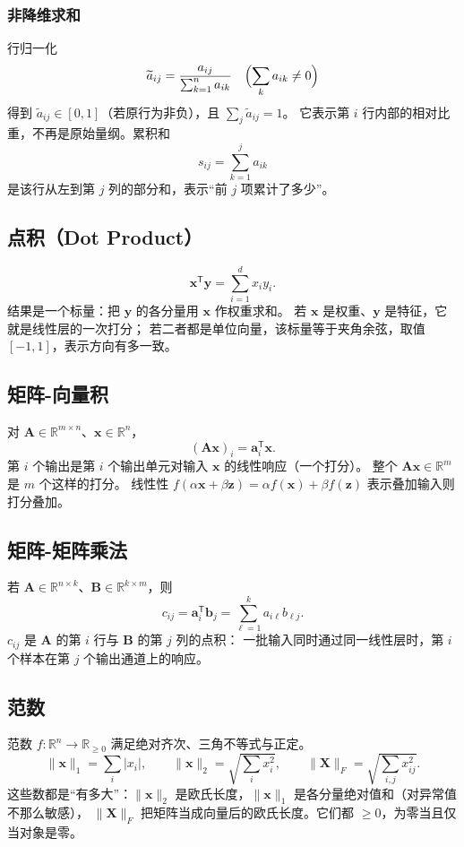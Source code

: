 \subsubsection{非降维求和}

行归一化
\[
\widetilde{a}_{ij}
=
\frac{a_{ij}}{\sum_{k=1}^{n}a_{ik}}
\quad
\Bigl(\sum_{k}a_{ik}\neq 0\Bigr)
\]
得到 $\widetilde{a}_{ij}\in[0,1]$（若原行为非负），且 $\sum_{j}\widetilde{a}_{ij}=1$。
它表示第 $i$ 行内部的相对比重，不再是原始量纲。累积和
\[
s_{ij}=\sum_{k=1}^{j}a_{ik}
\]
是该行从左到第 $j$ 列的部分和，表示“前 $j$ 项累计了多少”。

\subsection{点积（Dot Product）}

\[
\bm{x}^{\mathsf T}\bm{y}
=
\sum_{i=1}^{d}x_i y_i.
\]
结果是一个标量：把 $\bm{y}$ 的各分量用 $\bm{x}$ 作权重求和。
若 $\bm{x}$ 是权重、$\bm{y}$ 是特征，它就是线性层的一次打分；
若二者都是单位向量，该标量等于夹角余弦，取值 $[-1,1]$，表示方向有多一致。

\subsection{矩阵-向量积}

对 $\bm{A}\in\mathbb{R}^{m\times n}$、$\bm{x}\in\mathbb{R}^{n}$，
\[
(\bm{A}\bm{x})_i=\bm{a}_i^{\mathsf T}\bm{x}.
\]
第 $i$ 个输出是第 $i$ 个输出单元对输入 $\bm{x}$ 的线性响应（一个打分）。
整个 $\bm{A}\bm{x}\in\mathbb{R}^{m}$ 是 $m$ 个这样的打分。
线性性 $f(\alpha\bm{x}+\beta\bm{z})=\alpha f(\bm{x})+\beta f(\bm{z})$ 表示叠加输入则打分叠加。

\subsection{矩阵-矩阵乘法}

若 $\bm{A}\in\mathbb{R}^{n\times k}$、$\bm{B}\in\mathbb{R}^{k\times m}$，则
\[
c_{ij}=\bm{a}_i^{\mathsf T}\bm{b}_j=\sum_{\ell=1}^{k}a_{i\ell}b_{\ell j}.
\]
$c_{ij}$ 是 $\bm{A}$ 的第 $i$ 行与 $\bm{B}$ 的第 $j$ 列的点积：
一批输入同时通过同一线性层时，第 $i$ 个样本在第 $j$ 个输出通道上的响应。

\subsection{范数}

范数 $f:\mathbb{R}^{n}\to\mathbb{R}_{\ge 0}$ 满足绝对齐次、三角不等式与正定。
\[
\|\bm{x}\|_1=\sum_i|x_i|,
\qquad
\|\bm{x}\|_2=\sqrt{\sum_i x_i^2},
\qquad
\|\bm{X}\|_F=\sqrt{\sum_{i,j}x_{ij}^{2}}.
\]
这些数都是“有多大”：$\|\bm{x}\|_2$ 是欧氏长度，$\|\bm{x}\|_1$ 是各分量绝对值和（对异常值不那么敏感），
$\|\bm{X}\|_F$ 把矩阵当成向量后的欧氏长度。它们都 $\ge 0$，为零当且仅当对象是零。

